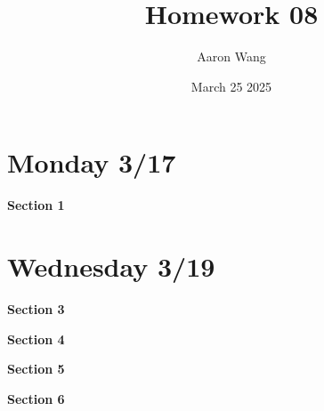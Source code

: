 \documentclass{article}
\title{Homework 08}
\author{Aaron Wang}
\date{March 25 2025}
\begin{document}
\maketitle
\section{Monday 3/17}
\begin{large}
 \textbf{Section 1}   
\end{large}
\begin{enumerate}
    
    
    
\end{enumerate}
\section{Wednesday 3/19}
\begin{large}
 \textbf{Section 3}   
\end{large}
\begin{enumerate}
    
    
    
    
\end{enumerate}
\begin{large}
 \textbf{Section 4}   
\end{large}
\begin{enumerate}
    
\end{enumerate}
\newpage
\begin{large}
 \textbf{Section 5}   
\end{large}
\begin{enumerate}
    
\end{enumerate}
\newpage
\begin{large}
 \textbf{Section 6}   
\end{large}
\begin{enumerate}
    
    
\end{enumerate}
\end{document}
